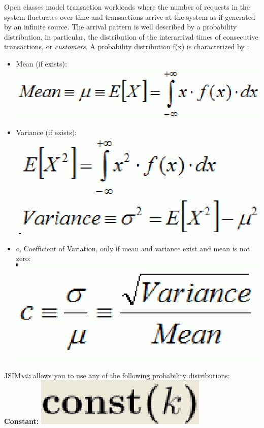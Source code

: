 Open classes model transaction workloads where the number of requests in the system fluctuates over time and transactions arrive at the system as if generated by an infinite source. The arrival pattern is well described by a probability distribution, in particular, the distribution of the interarrival times of consecutive transactions, or \emph{customers}.
A probability distribution f(x) is characterized by :
\begin{itemize}
\item Mean (if exists): \includegraphics[scale=.5]{img/jsim/Mean.eps}
\item Variance (if exists): \includegraphics[scale=.5]{img/jsim/variance.eps}
\item c, Coefficient of Variation, only if mean and variance exist and mean is not zero: \includegraphics[scale=.5]{img/jsim/CoeffVariation.eps}
\end{itemize}
JSIM\emph{wiz} allows you to use any of the following probability distributions:
\\ %
\textbf{Constant: }\includegraphics[scale=.5]{img/jsim/constant_f.eps}
